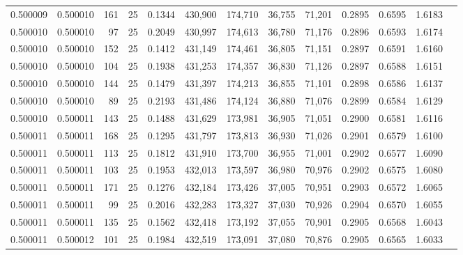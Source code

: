 \begin{tabular}{rrrrrrrrrrrrr}
0.500009 & 0.500010 &   161 &  25 &                                     0.1344 & 430,900 & 174,710 &  36,755 &  71,201 & 0.2895 & 0.6595 & 1.6183 \\
0.500010 & 0.500010 &    97 &  25 &                                     0.2049 & 430,997 & 174,613 &  36,780 &  71,176 & 0.2896 & 0.6593 & 1.6174 \\
0.500010 & 0.500010 &   152 &  25 &                                     0.1412 & 431,149 & 174,461 &  36,805 &  71,151 & 0.2897 & 0.6591 & 1.6160 \\
0.500010 & 0.500010 &   104 &  25 &                                     0.1938 & 431,253 & 174,357 &  36,830 &  71,126 & 0.2897 & 0.6588 & 1.6151 \\
0.500010 & 0.500010 &   144 &  25 &                                     0.1479 & 431,397 & 174,213 &  36,855 &  71,101 & 0.2898 & 0.6586 & 1.6137 \\
0.500010 & 0.500010 &    89 &  25 &                                     0.2193 & 431,486 & 174,124 &  36,880 &  71,076 & 0.2899 & 0.6584 & 1.6129 \\
0.500010 & 0.500011 &   143 &  25 &                                     0.1488 & 431,629 & 173,981 &  36,905 &  71,051 & 0.2900 & 0.6581 & 1.6116 \\
0.500011 & 0.500011 &   168 &  25 &                                     0.1295 & 431,797 & 173,813 &  36,930 &  71,026 & 0.2901 & 0.6579 & 1.6100 \\
0.500011 & 0.500011 &   113 &  25 &                                     0.1812 & 431,910 & 173,700 &  36,955 &  71,001 & 0.2902 & 0.6577 & 1.6090 \\
0.500011 & 0.500011 &   103 &  25 &                                     0.1953 & 432,013 & 173,597 &  36,980 &  70,976 & 0.2902 & 0.6575 & 1.6080 \\
0.500011 & 0.500011 &   171 &  25 &                                     0.1276 & 432,184 & 173,426 &  37,005 &  70,951 & 0.2903 & 0.6572 & 1.6065 \\
0.500011 & 0.500011 &    99 &  25 &                                     0.2016 & 432,283 & 173,327 &  37,030 &  70,926 & 0.2904 & 0.6570 & 1.6055 \\
0.500011 & 0.500011 &   135 &  25 &                                     0.1562 & 432,418 & 173,192 &  37,055 &  70,901 & 0.2905 & 0.6568 & 1.6043 \\
0.500011 & 0.500012 &   101 &  25 &                                     0.1984 & 432,519 & 173,091 &  37,080 &  70,876 & 0.2905 & 0.6565 & 1.6033 \\

\end{tabular}
